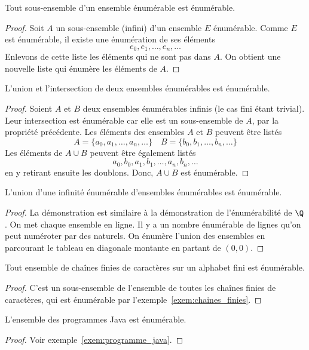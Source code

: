 \begin{myprop}
	Tout sous-ensemble d'un ensemble énumérable est énumérable.
	\begin{proof}
Soit $A$ un sous-ensemble (infini) d'un ensemble $E$ énumérable. Comme $E$ est énumérable, il existe une énumération de ses éléments
\[
e_0, e_1, \ldots , e_n, \ldots
\]
Enlevons de cette liste les éléments qui ne sont pas dans $A$. On obtient une nouvelle liste qui énumère les éléments de $A$.
	\end{proof}
\end{myprop}

\begin{myprop}
	L'union et l'intersection de deux ensembles énumérables est énumérable.
	\begin{proof}
		Soient $A$ et $B$ deux ensembles énumérables infinis (le cas fini étant trivial). Leur intersection est énumérable car elle est un sous-ensemble de $A$, par la propriété précédente. Les éléments des ensembles $A$ et $B$ peuvent être listés
\[
A = \{ a_0, a_1, \ldots , a_n, \ldots\}  \quad
B = \{ b_0, b_1, \ldots , b_n, \ldots\}
\]
Les éléments de $A \cup B$ peuvent être également listés
\[
a_0, b_0, a_1, b_1, \ldots, a_n, b_n, \ldots
\]
en y retirant ensuite les doublons. Donc, $A \cup B$ est énumérable.
	\end{proof}
\end{myprop}

\begin{myprop}
	L'union d'une infinité énumérable d'ensembles énumérables est énumérable.
    \begin{proof}
      La démonstration est similaire à la démonstration de l'énumérabilité de $\Q$.
      On met chaque ensemble en ligne. Il y a un nombre énumérable de lignes qu'on peut numéroter par des naturels.
      On énumère l'union des ensembles en parcourant le tableau en diagonale montante en partant de $(0,0)$.
    \end{proof}
\end{myprop}

\begin{myprop}
 Tout ensemble de chaînes finies de caractères sur un alphabet fini est énumérable.
 \begin{proof}
C'est un sous-ensemble de l'ensemble de toutes les chaînes finies de caractères, qui est énumérable par l'exemple~\ref{exem:chaines_finies}.
 \end{proof}
\end{myprop}

\begin{myprop} \label{prop:programme_enumerable}
 L'ensemble des programmes Java est énumérable.
 \begin{proof}
  Voir exemple~\ref{exem:programme_java}.
 \end{proof}
\end{myprop}


